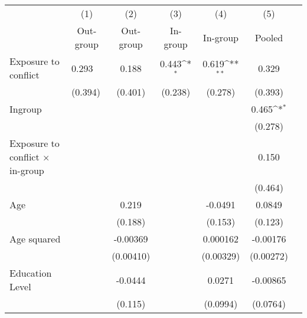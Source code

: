 {
\def\sym#1{\ifmmode^{#1}\else\(^{#1}\)\fi}
\begin{tabularx}{0.8\textwidth}{Xl*{5}{c}}
\hline\hline
                    &\multicolumn{1}{c}{(1)}&\multicolumn{1}{c}{(2)}&\multicolumn{1}{c}{(3)}&\multicolumn{1}{c}{(4)}&\multicolumn{1}{c}{(5)}\\
                    &\multicolumn{1}{c}{Out-group}&\multicolumn{1}{c}{Out-group}&\multicolumn{1}{c}{In-group}&\multicolumn{1}{c}{In-group}&\multicolumn{1}{c}{Pooled}\\
\hline
Exposure to conflict&       0.293         &       0.188         &       0.443\sym{*}  &       0.619\sym{**} &       0.329         \\
                    &     (0.394)         &     (0.401)         &     (0.238)         &     (0.278)         &     (0.393)         \\
[0.5em]
Ingroup             &                     &                     &                     &                     &       0.465\sym{*}  \\
                    &                     &                     &                     &                     &     (0.278)         \\
[0.5em]
Exposure to conflict × in-group &                     &                     &                     &                     &       0.150         \\
                    &                     &                     &                     &                     &     (0.464)         \\
[0.5em]
Age                 &                     &       0.219         &                     &     -0.0491         &      0.0849         \\
                    &                     &     (0.188)         &                     &     (0.153)         &     (0.123)         \\
[0.5em]
Age squared         &                     &    -0.00369         &                     &    0.000162         &    -0.00176         \\
                    &                     &   (0.00410)         &                     &   (0.00329)         &   (0.00272)         \\
[0.5em]
Education Level     &                     &     -0.0444         &                     &      0.0271         &    -0.00865         \\
                    &                     &     (0.115)         &                     &    (0.0994)         &    (0.0764)         \\

\end{tabularx}}
